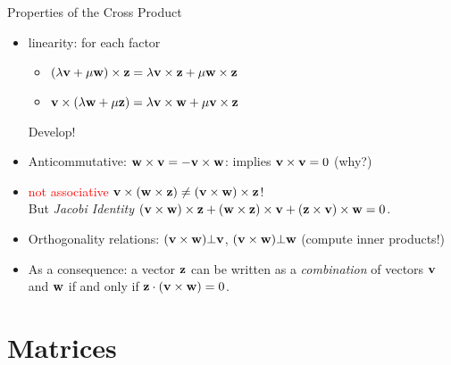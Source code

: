 \documentclass[8pt,dvipsnames]{beamer}
\begin{document}
\begin{frame}{Properties of the Cross Product}
	\begin{itemize}[<+->]
	\item linearity: for each factor
	\begin{itemize}
		\item $(\lambda{\bf v} + \mu{\bf w})\times {\bf z} = \lambda{\bf v}\times {\bf z} + \mu{\bf w}\times {\bf z}$
		\item ${\bf v} \times(\lambda{\bf w} + \mu{\bf z}) = \lambda{\bf v}\times {\bf w} + \mu{\bf v}\times {\bf z}$
	\end{itemize}
	\pause Develop!\vfill
	\item Anticommutative: ${\bf w}\times {\bf v} = -{\bf v}\times{\bf w}$: implies ${\bf v}\times {\bf v} = 0$ (why?)\vfill
	\item \raisebox{2mm}{\dbend} \textcolor{red}{not associative} ${\bf v}\times\left({\bf w}\times{\bf z}\right) \not= \left({\bf v}\times{\bf w}\right)\times{\bf z}$!\\
	But \emph{Jacobi Identity} $\left({\bf v}\times{\bf w}\right)\times{\bf z} + \left({\bf w}\times{\bf z}\right)\times{\bf v} + \left({\bf z}\times{\bf v}\right)\times{\bf w} = 0$.\vfill 
	\item Orthogonality relations: $({\bf v}\times{\bf w}) \bot {\bf v}$, $({\bf v}\times{\bf w}) \bot{\bf w}$ (compute inner products!)\vfill
	\item As a consequence: a vector ${\bf z}$ can be written as a \emph{combination} of vectors ${\bf v}$ and ${\bf w}$ if and only if ${\bf z}\cdot({\bf v}\times{\bf w}) = 0$.
	\end{itemize}
\end{frame}




\section{Matrices}
\end{document}
